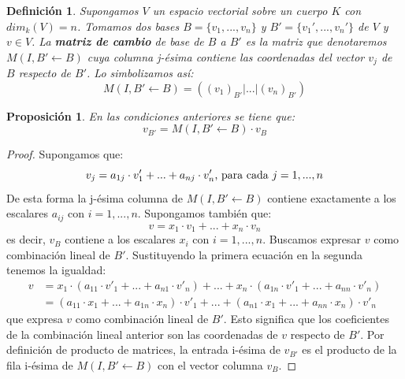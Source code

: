 \documentclass[a4paper,11pt, oneside]{book}
\newtheorem{defi}{Definición}
\newtheorem{prop}{Proposición}
\begin{document}
\begin{defi}
	Supongamos $V$ un espacio vectorial sobre un cuerpo $K$ con $dim_k(V) = n$. Tomamos dos bases $B = \{v_1,...,v_n\}$ y $B' = \{v_1',...,v_n'\}$ de $V$ y $ v \in V$. La \textbf{matriz de cambio} de base de $B$ a $B'$ es la matriz que denotaremos $M(I, B' \leftarrow B)$ cuya columna j-ésima contiene las coordenadas del vector $v_j$ de $B$ respecto de $B'$. Lo simbolizamos así:
	\begin{equation}
	M(I, B' \leftarrow B) = ((v_1)_{B'} | ... |(v_n)_{B'})
	\end{equation}
\end{defi}
\begin{prop}
	\label{prop:cambio_base}
	En las condiciones anteriores se tiene que:
	\begin{equation}
	v_{B'} = M(I, B' \leftarrow B)\cdot  v_B
	\end{equation}
\end{prop}
\begin{proof}
	Supongamos que:
	\begin{equation}
	v_j = a_{1j}\cdot v'_1 +...+ a_{nj}\cdot v'_n\textup{, para cada }j = 1,...,n
	\end{equation}
	De esta forma la j-ésima columna de $M(I, B' \leftarrow B)$  contiene exactamente a los escalares $a_{ij}$ con $i=1,...,n$. Supongamos también que:
	\begin{equation}
	v = x_1\cdot v_1+...+x_n\cdot v_n
	\end{equation}
	es decir, $v_B$ contiene a los escalares $x_i$ con $i=1,...,n$. Buscamos expresar $v$ como combinación lineal de $B'$. Sustituyendo la primera ecuación en la segunda tenemos la igualdad:
	\begin{equation}
	\begin{split}
	v &= x_1\cdot (a_{11}\cdot v'_{1}+...+a_{n1}\cdot v'_n)+...+x_n\cdot (a_{1n}\cdot v'_1+...+a_{nn}\cdot v'_n) \\
	 &= 
	 (a_{11}\cdot x_1+...+a_{1n}\cdot x_n)\cdot v'_1 +...+(a_{n1}\cdot x_1+...+a_{nn}\cdot x_n)\cdot v'_n
	 \end{split}
	\end{equation}
	que expresa $v$ como combinación lineal de $B'$. Esto significa que los coeficientes de la combinación lineal anterior son las coordenadas de $v$ respecto de $B'$. Por definición de producto de matrices, la entrada i-ésima de $v_{B'}$ es el producto de la fila i-ésima de $M(I, B' \leftarrow B)$ con el vector columna $v_B$.
\end{proof}
\end{document}
